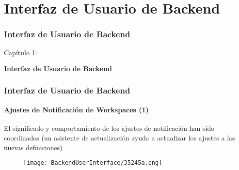 %

\section{Interfaz de Usuario de Backend}
\begin{frame}[fragile]
	\frametitle{Interfaz de Usuario de Backend}

	\begin{center}\huge{Capítulo 1:}\end{center}
	\begin{center}\huge{\color{typo3darkgrey}\textbf{Interfaz de Usuario de Backend}}\end{center}

\end{frame}

\begin{frame}[fragile]
	\frametitle{Interfaz de Usuario de Backend}
	\framesubtitle{Ajustes de Notificación de Workspaces (1)}

	El significado y comportamiento de los ajustes de notificación han sido coordinados\newline
	\smaller(un asistente de actualización ayuda a actualizar los ajustes a las nuevas definiciones)\normalsize

	\begin{figure}
		\texttt{[image: BackendUserInterface/35245a.png]}
	\end{figure}

\end{frame}

